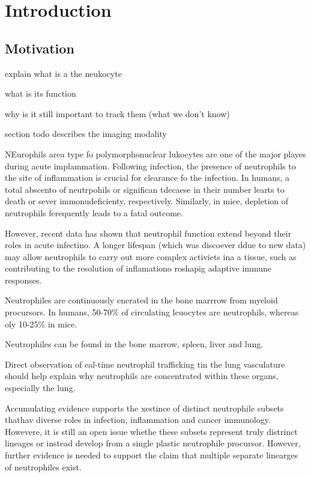 \chapter{Introduction }

	\section{Motivation }
		
		explain what is a the neukocyte
		
		what is its function
		
		why is it still important to track them (what we don't know)
		
		section todo describes the imaging modality
		
		
		
		NEurophils area  type fo polymorphonuclear lukocytes are one of the major playes during acute implammation. Following infection, the presence of neutrophils to the site of inflammation is crucial for clearance fo the infection.  In humans, a total abscento of neutrpohils or significan tdecaese in their number learts to death or sever immonudeficienty, respectively. Similarly, in mice, depletion of neutrophils ferequently leads to a fatal outcome. 
		
		
		However, recent data has shown that neutrophil function extend beyond their roles in acute infectino. A longer lifespan (which was discoever ddue to new data) may allow neutrophils to carry out more complex activiets ina a tissue, such as contributing to the resolution of inflamationo roshapig adaptive immune responses.
		
		Neutrophiles are continuously enerated in the bone marrrow from myeloid procursors. In humans, 50-70\% of circulating leuocytes are neutrophils, whereas oly 10-25\% in mice. 
		
		Neutrophiles can be found in the bone marrow, spleen, liver and lung. 
		
		Direct observation of eal-time neutrophil trafficking tin the lung vasculature should help explain why neutrophils are concentrated within these organs, especially the lung.
		
		Accumulating evidence supports the xestince of distinct neutrophile subsets thathav diverse roles in infection, inflammation and cancer immunology. Howevere, it is still an open issue whethe these subsets represent truly distrinct lineages or instead develop from a single plastic neutrophile procursor. However, further evidence is needed to support the claim that multiple separate linearges of neutrophiles exist.
		
